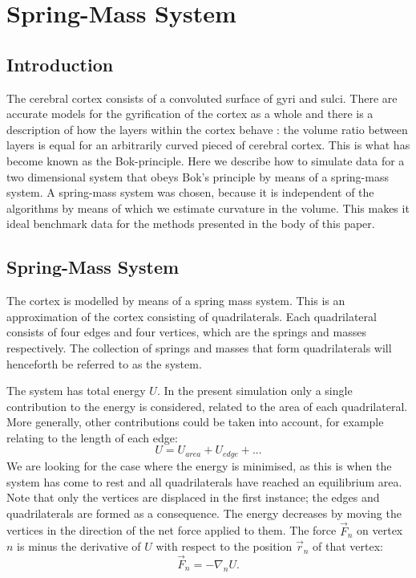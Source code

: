 \section{Spring-Mass System}
\label{sec:Appendix1}
\subsection{Introduction}
The cerebral cortex consists of a convoluted surface of gyri and sulci. There are accurate models for the gyrification of the cortex as a whole \cite{Tallinen2014} and there is a description of how the layers within the cortex behave \cite{Bok1929}: the volume ratio between layers is equal for an arbitrarily curved pieced of cerebral cortex. This is what has become known as the Bok-principle. Here we describe how to simulate data for a two dimensional system that obeys Bok's principle by means of a spring-mass system. A spring-mass system was chosen, because it is independent of the algorithms by means of which we estimate curvature in the volume. This makes it ideal benchmark data for the methods presented in the body of this paper.

\subsection{Spring-Mass System}
The cortex is modelled by means of a spring mass system. This is an approximation of the cortex consisting of quadrilaterals. Each quadrilateral consists of four edges and four vertices, which are the springs and masses respectively. The collection of springs and masses that form quadrilaterals will henceforth be referred to as the system.

The system has total energy $U$. In the present simulation only a single contribution to the energy is considered, related to the area of each quadrilateral. More generally, other contributions could be taken into account, for example relating to the length of each edge:
\begin{equation}
U=U_{area}+U_{edge}+...
\end{equation}
We are looking for the case where the energy is minimised, as this is when the system has come to rest and all quadrilaterals have reached an equilibrium area. Note that only the vertices are displaced in the first instance; the edges and quadrilaterals are formed as a consequence. The energy decreases by moving the vertices in the direction of the net force applied to them. The force $\vec{F}_n$ on vertex $n$ is minus the derivative of $U$ with respect to the position $\vec{r}_n$ of that vertex: 
\begin{equation}
\vec{F}_n= -\nabla_n U.
\label{Forces}
\end{equation}

